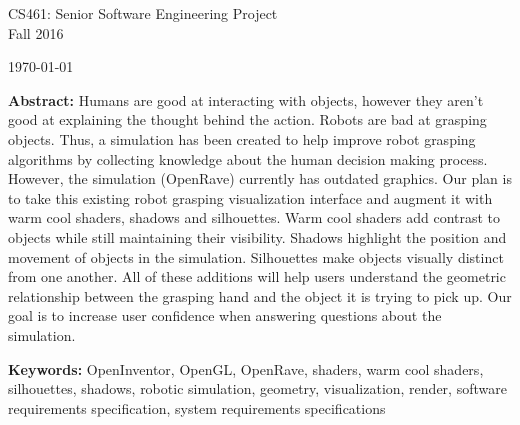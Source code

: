 \documentclass[10pt,journal,compsoc]{IEEEtran}
\begin{document}
\begin{titlepage}
\begin{flushleft}
\begin{bfseries}
\end{bfseries}

\vspace{15mm}
\Large{CS461: Senior Software Engineering Project} \\
\Large{Fall 2016} \\

\vspace{10mm}

\today

\vfill

\begin{normalsize}
{\bf Abstract:}
Humans are good at interacting with objects, however they aren't good at explaining the thought behind the action.
Robots are bad at grasping objects.
Thus, a simulation has been created to help improve robot grasping algorithms by collecting knowledge about the human decision making process.
However, the simulation (OpenRave) currently has outdated graphics.
Our plan is to take this existing robot grasping visualization interface and augment it with warm cool shaders, shadows and silhouettes.
Warm cool shaders add contrast to objects while still maintaining their visibility.
Shadows highlight the position and movement of objects in the simulation.
Silhouettes make objects visually distinct from one another.
All of these additions will help users understand the geometric relationship between the grasping hand and the object it is trying to pick up. 
Our goal is to increase user confidence when answering questions about the simulation.

{\bf Keywords:} OpenInventor, OpenGL, OpenRave, shaders, warm cool shaders, silhouettes, shadows, robotic simulation, geometry, visualization, render,
software requirements specification, system requirements specifications
\end{normalsize}
\end{flushleft}

\newpage

\end{titlepage}
\end{document}
